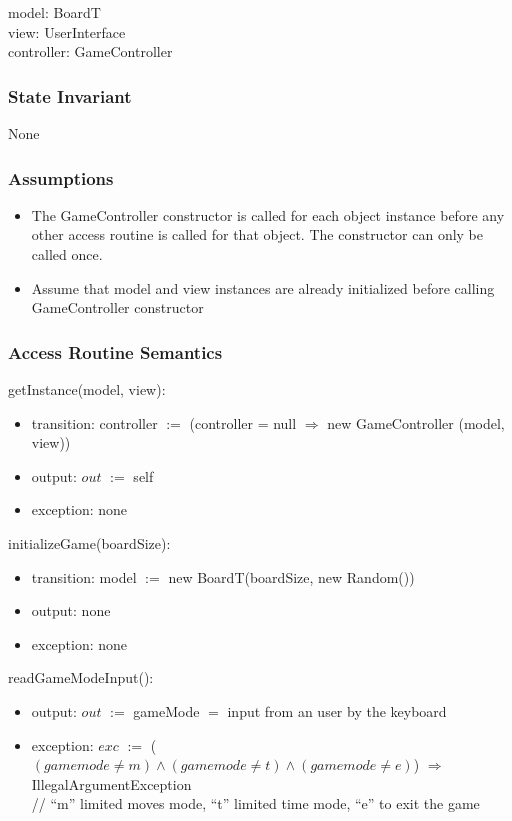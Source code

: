 \documentclass[12pt]{article}
\begin{document}
model: BoardT \\
view: UserInterface \\
controller: GameController

\subsubsection* {State Invariant}

None

\subsubsection* {Assumptions}

\begin{itemize}
  \item The GameController constructor is called for each object instance before any
  other access routine is called for that object.  The constructor can only be
  called once.
  \item Assume that model and view instances are already initialized before calling GameController
        constructor
\end{itemize}

\subsubsection* {Access Routine Semantics}

\noindent getInstance(model, view):
\begin{itemize}
  \item transition: controller $:=$ (controller = null $\Rightarrow$ new GameController (model, view))
  \item output: $out$ $:=$ self
  \item exception: none
\end{itemize}

\noindent initializeGame(boardSize):
\begin{itemize}
  \item transition: model $:=$ new BoardT(boardSize, new Random())
  \item output: none
  \item exception: none
\end{itemize}

\noindent readGameModeInput():
\begin{itemize}
  \item output: $out$ $:=$ gameMode $=$ input from an user by the keyboard
  \item exception: $exc$ $:=$ ($(gamemode \neq m) \wedge (gamemode \neq t) \wedge (gamemode \neq e)$) $\Rightarrow$ IllegalArgumentException\\
  // ``m'' limited moves mode, ``t'' limited time mode, ``e'' to exit the game
\end{itemize}
\end{document}
